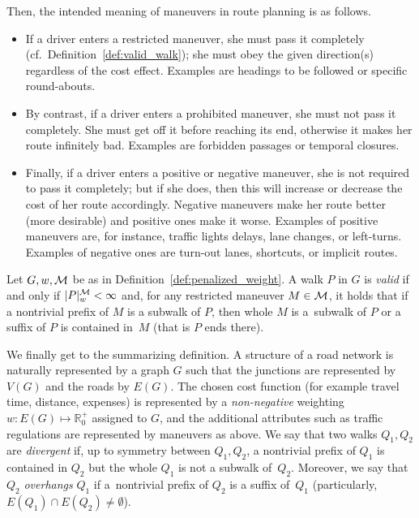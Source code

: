 \documentclass[envcountsect,envcountsame]{llncs}
\begin{document}
Then, the intended meaning of maneuvers in route planning is as follows.

\begin{itemize}
\parskip2pt
\item If a driver enters a restricted maneuver, she must pass it completely
  (cf.~Definition~\ref{def:valid_walk}); 
  she must obey the given direction(s) regardless of the cost effect.
  Examples are headings to be followed or specific round-abouts.

\item By contrast, if a driver enters a prohibited maneuver, she must 
  not pass it completely. She must get off it before reaching its end, 
  otherwise it makes her route infinitely bad. Examples are forbidden 
  passages or temporal closures.

\item Finally, if a driver enters a positive or negative maneuver, she is
  not required to pass it completely;
  but if she does, then this will increase or decrease the 
  cost of her route accordingly. Negative maneuvers make her route 
  better (more desirable) and positive ones make it worse.
  Examples of positive maneuvers are, for instance, traffic lights delays, lane
  changes, or left-turns.
  Examples of negative ones are turn-out lanes, shortcuts, or implicit routes.
\end{itemize}

\begin{definition}
\label{def:valid_walk}
Let $G,w,\cal{M}$ be as in Definition~\ref{def:penalized_weight}. A walk 
$P$ in $G$ is \emph{valid} if and only if $|P|_w^{\cal{M}} < \infty$ and, for any
restricted maneuver $M\in\cal{M}$, it holds that if a nontrivial prefix of
$M$ is a subwalk of $P$, then whole $M$ is a~subwalk of $P$ or a suffix of $P$
is contained in~$M$ (that is $P$ ends there).
\end{definition}

We finally get to the summarizing definition. A structure of a road network 
is naturally represented by a graph $G$ such that the junctions are 
represented by $V(G)$ and the roads by $E(G)$. The chosen cost function 
(for example travel time, distance, expenses) is represented by a \emph{non-negative}
weighting $w: E(G) \mapsto\mathbb{R}^+_0$ assigned to $G$, and the additional 
attributes such as traffic regulations are represented by maneuvers as above.
We say that two walks $Q_1,Q_2$ are {\em divergent} if, up to symmetry
between $Q_1,Q_2$, a nontrivial prefix of $Q_1$ is contained in $Q_2$ but
the whole $Q_1$ is not a subwalk of~$Q_2$. Moreover, we say that $Q_2$ 
{\em overhangs} $Q_1$ if a~nontrivial prefix of $Q_2$ is a suffix of~$Q_1$
(particularly, $E(Q_1)\cap E(Q_2)\neq \emptyset$).
\end{document}
